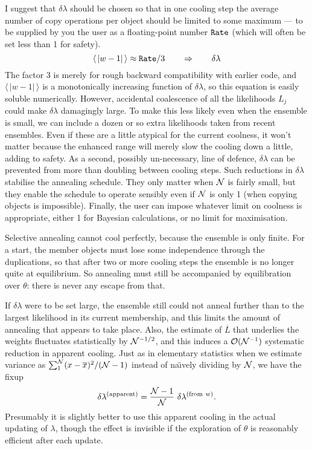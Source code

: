 I suggest that $\delta\lambda$ should be chosen so that in one cooling step the average number of copy operations per object should be limited to some maximum 
--- to be supplied by you the user as a floating-point number $\tt Rate$ (which will often be set less than 1 for safety).
$$
    \langle\,|w-1|\,\rangle \approx {\tt Rate}/3 \qquad \Rightarrow \qquad \delta\lambda
$$
The factor 3 is merely for rough backward compatibility with earlier code, and $\langle\,|w-1|\,\rangle$ is a monotonically increasing function of $\delta\lambda$, 
so this equation is easily soluble numerically.
However, accidental coalescence of all the likelihoods $L_j$ could make $\delta\lambda$ damagingly large.
To make this less likely even when the ensemble is small, we can include a dozen or so extra likelihoods taken from recent ensembles.
Even if these are a little atypical for the current coolness, it won't matter because the enhanced range will merely slow the cooling down a little, adding to safety.
As a second, possibly un-necessary, line of defence, $\delta\lambda$ can be prevented from more than doubling between cooling steps.
Such reductions in $\delta\lambda$ stabilise the annealing schedule.
They only matter when $\cal N$ is fairly small, but they enable the schedule to operate sensibly even if $\cal N$ is only 1 (when copying objects is impossible).
Finally, the user can impose whatever limit on coolness is appropriate, either 1 for Bayesian calculations, or no limit for maximisation.

\bigskip
{}
\smallskip

Selective annealing cannot cool perfectly, because the ensemble is only finite.  
For a start, the member objects must lose some independence through the duplications, 
so that after two or more cooling steps the ensemble is no longer quite at equilibrium.
So annealing must still be accompanied by equilibration over $\theta$: there is never any escape from that.

If $\delta\lambda$ were to be set large, the ensemble still could not anneal further than to the largest likelihood in its current membership,
and this limits the amount of annealing that {\rm appears} to take place.
Also, the estimate of $\overline L$ that underlies the weights fluctuates statistically by ${\cal N}^{-1/2}$, 
and this induces a ${\cal O}({\cal N}^{-1})$ systematic reduction in apparent cooling.
Just as in elementary statistics when we estimate variance as $\sum_1^{\cal N}(x - \overline x)^2 / ({\cal N} - 1)$ instead of na{\"\i}vely dividing by $\cal N$, 
we have the fixup
$$
 \delta\lambda^{\rm (apparent)} = {{\cal N} - 1 \over {\cal N}}\ \delta\lambda^{({\rm from}\ w)}.
$$
Presumably it is slightly better to use this apparent cooling in the actual updating of $\lambda$, 
though the effect is invisible if the exploration of $\theta$ is reasonably efficient after each update.

